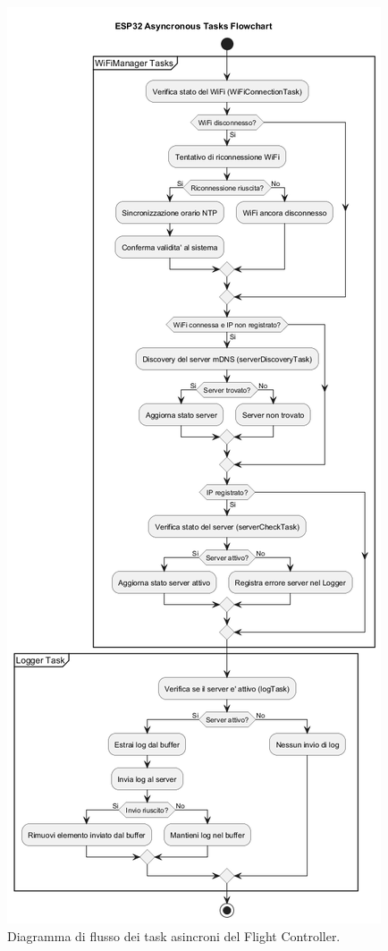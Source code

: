 \begin{figure}[h!]
    \centering
    \includegraphics[width=\textwidth]{diagrams/esp32_asynctasks_flowchart.png}
    \caption{Diagramma di flusso dei task asincroni del Flight Controller.}
    \label{fig:esp32_asynctasks_flowchart}
\end{figure}